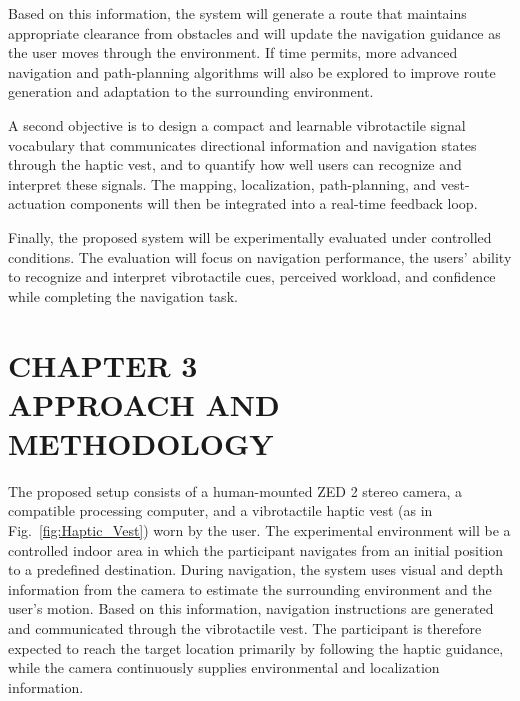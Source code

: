 \documentclass[12pt]{report}
\begin{document}
Based on this information, the system will generate a route that maintains appropriate clearance from obstacles and will update the navigation guidance as the user moves through the environment. If time permits, more advanced navigation and path-planning algorithms will also be explored to improve route generation and adaptation to the surrounding environment.

A second objective is to design a compact and learnable vibrotactile signal vocabulary that communicates directional information and navigation states through the haptic vest, and to quantify how well users can recognize and interpret these signals. The mapping, localization, path-planning, and vest-actuation components will then be integrated into a real-time feedback loop.

Finally, the proposed system will be experimentally evaluated under controlled conditions. The evaluation will focus on navigation performance, the users' ability to recognize and interpret vibrotactile cues, perceived workload, and confidence while completing the navigation task.

\setcounter{section}{3}
\setcounter{subsection}{0}
\setcounter{subsubsection}{0}
\chapter*{\centering CHAPTER 3\\[4pt]APPROACH AND METHODOLOGY}
\thispagestyle{fancy}

The proposed setup consists of a human-mounted ZED 2 stereo camera, a compatible processing computer, and a vibrotactile haptic vest (as in Fig.~\ref{fig:Haptic_Vest}) worn by the user. The experimental environment will be a controlled indoor area in which the participant navigates from an initial position to a predefined destination. During navigation, the system uses visual and depth information from the camera to estimate the surrounding environment and the user's motion. Based on this information, navigation instructions are generated and communicated through the vibrotactile vest. The participant is therefore expected to reach the target location primarily by following the haptic guidance, while the camera continuously supplies environmental and localization information.
\end{document}
